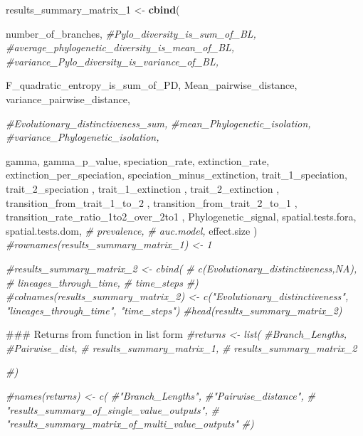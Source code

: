 \documentclass[]{book}
\newenvironment{Shaded}{\begin{snugshade}}{\end{snugshade}}
\newcommand{\KeywordTok}[1]{\textcolor[rgb]{0.13,0.29,0.53}{\textbf{{#1}}}}
\newcommand{\DecValTok}[1]{\textcolor[rgb]{0.00,0.00,0.81}{{#1}}}
\newcommand{\StringTok}[1]{\textcolor[rgb]{0.31,0.60,0.02}{{#1}}}
\newcommand{\CommentTok}[1]{\textcolor[rgb]{0.56,0.35,0.01}{\textit{{#1}}}}
\newcommand{\NormalTok}[1]{{#1}}
\theoremstyle{definition}
\theoremstyle{definition}
\theoremstyle{remark}
\begin{document}
\begin{Shaded}
\begin{Highlighting}[]
\NormalTok{results_summary_matrix_}\DecValTok{1}\NormalTok{ <-}\StringTok{ }\KeywordTok{cbind}\NormalTok{(}

\NormalTok{        number_of_branches,}
        \CommentTok{#Pylo_diversity_is_sum_of_BL,}
        \CommentTok{#average_phylogenetic_diversity_is_mean_of_BL,}
        \CommentTok{#variance_Pylo_diversity_is_variance_of_BL,}

\NormalTok{        F_quadratic_entropy_is_sum_of_PD,}
\NormalTok{        Mean_pairwise_distance,}
\NormalTok{        variance_pairwise_distance,}

        \CommentTok{#Evolutionary_distinctiveness_sum,}
        \CommentTok{#mean_Phylogenetic_isolation,}
        \CommentTok{#variance_Phylogenetic_isolation,}

\NormalTok{        gamma,}
\NormalTok{        gamma_p_value,}
\NormalTok{        speciation_rate,}
\NormalTok{        extinction_rate,}
\NormalTok{        extinction_per_speciation,}
\NormalTok{        speciation_minus_extinction,}
\NormalTok{        trait_1_speciation,}
\NormalTok{        trait_2_speciation ,}
\NormalTok{        trait_1_extinction ,}
\NormalTok{        trait_2_extinction ,}
\NormalTok{        transition_from_trait_1_to_}\DecValTok{2}\NormalTok{ ,}
\NormalTok{        transition_from_trait_2_to_}\DecValTok{1}\NormalTok{ ,}
\NormalTok{        transition_rate_ratio_1to2_over_2to1 ,}
\NormalTok{        Phylogenetic_signal,}
\NormalTok{        spatial.tests.fora,}
\NormalTok{        spatial.tests.dom,}
       \CommentTok{# prevalence,}
       \CommentTok{# auc.model,}
\NormalTok{        effect.size}
\NormalTok{      )}
      \CommentTok{#rownames(results_summary_matrix_1) <- 1}

      \CommentTok{#results_summary_matrix_2 <- cbind(}
      \CommentTok{#  c(Evolutionary_distinctiveness,NA),}
      \CommentTok{#  lineages_through_time,}
      \CommentTok{#  time_steps}
      \CommentTok{#)}
      \CommentTok{#colnames(results_summary_matrix_2) <- c("Evolutionary_distinctiveness", "lineages_through_time", "time_steps")}
      \CommentTok{#head(results_summary_matrix_2)}

\NormalTok{      ### Returns from function in list form}
      \CommentTok{#returns <- list(}
        \CommentTok{#Branch_Lengths,}
        \CommentTok{#Pairwise_dist,}
      \CommentTok{#  results_summary_matrix_1,}
      \CommentTok{#  results_summary_matrix_2}

      \CommentTok{#)}

      \CommentTok{#names(returns) <- c(}
        \CommentTok{#"Branch_Lengths",}
        \CommentTok{#"Pairwise_distance",}
       \CommentTok{# "results_summary_of_single_value_outputs",}
       \CommentTok{# "results_summary_matrix_of_multi_value_outputs"}
      \CommentTok{#)}
\end{Highlighting}
\end{Shaded}
\end{document}
